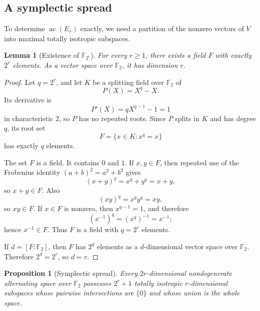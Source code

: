 \documentclass[11pt]{article}
\newtheorem{proposition}[theorem]{Proposition}
\newtheorem{lemma}[theorem]{Lemma}
\theoremstyle{definition}
\newcommand{\F}{\mathbb{F}}
\newcommand{\ac}{\operatorname{ac}}
\begin{document}
\subsection{A symplectic spread}

To determine $\ac(E_r)$ exactly, we need a partition of the nonzero vectors of $V$ into maximal totally isotropic subspaces.

\begin{lemma}[Existence of $\F_{2^r}$]\label{lem:finite-field}
For every $r\ge1$, there exists a field $F$ with exactly $2^r$ elements.  As a vector space over $\F_2$, it has dimension $r$.
\end{lemma}

\begin{proof}
Let $q=2^r$, and let $K$ be a splitting field over $\F_2$ of
\[
 P(X)=X^q-X.
\]
Its derivative is
\[
 P'(X)=qX^{q-1}-1=1
\]
in characteristic $2$, so $P$ has no repeated roots.  Since $P$ splits in $K$ and has degree $q$, its root set
\[
 F=\{x\in K:x^q=x\}
\]
has exactly $q$ elements.

The set $F$ is a field.  It contains $0$ and $1$.  If $x,y\in F$, then repeated use of the Frobenius identity $(a+b)^2=a^2+b^2$ gives
\[
 (x+y)^q=x^q+y^q=x+y,
\]
so $x+y\in F$.  Also
\[
 (xy)^q=x^qy^q=xy,
\]
so $xy\in F$.  If $x\in F$ is nonzero, then $x^{q-1}=1$, and therefore
\[
 (x^{-1})^q=(x^q)^{-1}=x^{-1};
\]
hence $x^{-1}\in F$.  Thus $F$ is a field with $q=2^r$ elements.

If $d=[F:\F_2]$, then $F$ has $2^d$ elements as a $d$-dimensional vector space over $\F_2$.  Therefore $2^d=2^r$, so $d=r$.
\end{proof}

\begin{proposition}[Symplectic spread]\label{prop:symplectic-spread}
Every $2r$-dimensional nondegenerate alternating space over $\F_2$ possesses $2^r+1$ totally isotropic $r$-dimensional subspaces whose pairwise intersections are $\{0\}$ and whose union is the whole space.
\end{proposition}
\end{document}
